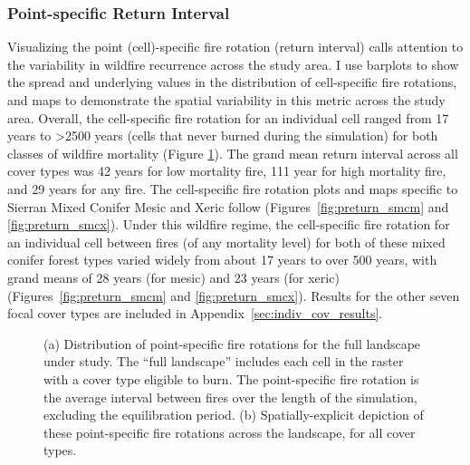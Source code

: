 \subsubsection*{Point-specific Return Interval}
Visualizing the point (cell)-specific fire rotation (return interval) calls attention to the variability in wildfire recurrence across the study area. I use barplots to show the spread and underlying values in the distribution of cell-specific fire rotations, and maps to demonstrate the spatial variability in this metric across the study area. Overall, the cell-specific fire rotation for an individual cell ranged from 17 years to \textgreater 2500 years (cells that never burned during the simulation) for both classes of wildfire mortality (Figure \ref{fig:preturn}). The grand mean return interval across all cover types was 42 years for low mortality fire, 111 year for high mortality fire, and 29 years for any fire. The cell-specific fire rotation plots and maps specific to Sierran Mixed Conifer Mesic and Xeric follow (Figures~\ref{fig:preturn_smcm} and \ref{fig:preturn_smcx}). Under this wildfire regime, the cell-specific fire rotation for an individual cell between fires (of any mortality level) for both of these mixed conifer forest types varied widely from about 17 years to over 500 years, with grand means of 28 years (for mesic) and 23 years (for xeric) (Figures~\ref{fig:preturn_smcm} and \ref{fig:preturn_smcx}). Results for the other seven focal cover types are included in Appendix~\ref{sec:indiv_cov_results}. 



\begin{figure}[!htbp]
  \centering
  \qquad
  \caption{(a) Distribution of point-specific fire rotations for the full landscape under study. The ``full landscape'' includes each cell in the raster with a cover type eligible to burn. The point-specific fire rotation is the average interval between fires over the length of the simulation, excluding the equilibration period. (b) Spatially-explicit depiction of these point-specific fire rotations across the landscape, for all cover types.}
  \label{fig:preturn}
\end{figure}

